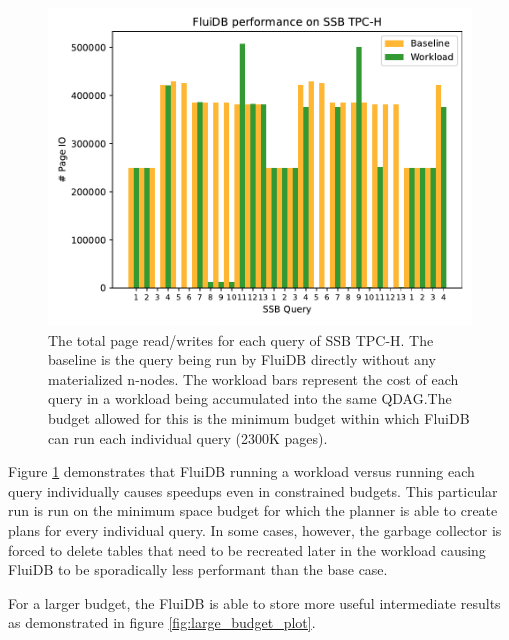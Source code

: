 \newcommand{\ioperfdescr}{The total page read/writes for
  each query of SSB TPC-H. The baseline is the query being
  run by FluiDB directly without any materialized n-nodes. The workload
  bars represent the cost of each query in a workload being
  accumulated into the same QDAG.}
\begin{figure}[H]
\centering
\includegraphics[width=.9\linewidth]{./plans/io_perf_23000.pdf}
\caption{\label{fig:min_budget_plot} \ioperfdescr The budget allowed
  for this is the minimum budget within which FluiDB can run each
  individual query (2300K pages).}
\end{figure}

Figure \ref{fig:min_budget_plot} demonstrates that FluiDB running a
workload versus running each query individually causes speedups even
in constrained budgets. This particular run is run on the minimum
space budget for which the planner is able to create plans for every
individual query. In some cases, however, the garbage collector is
forced to delete tables that need to be recreated later in the
workload causing FluiDB to be sporadically less performant than the
base case.

For a larger budget, the FluiDB is able to store more useful
intermediate results as demonstrated in figure
\ref{fig:large_budget_plot}.

